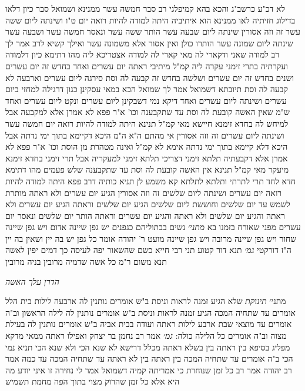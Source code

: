 \documentclass[12pt, openany]{book}
\begin{document}
{לא דכ"ע כרשב"ג והכא בהא קמיפלגי  רב סבר חמשה עשר ממנינא ושמואל סבר כיון דלאו בדילוג חזיתיה לאו ממנינא הוא 
איתיביה  היתה למודה להיות רואה יום ט"ו ושינתה ליום ששה עשר זה וזה אסורין  שינתה ליום שבעה עשר הותר ששה עשר ונאסר חמשה עשר ושבעה עשר 
שינתה ליום שמונה עשר הותרו כולן ואין אסור אלא משמונה עשר ואילך  קשיא לרב  אמר לך רב  למודה שאני 
ודקארי לה מאי קארי לה  למודה אצטריכא ליה  מהו דתימא  כיון דלמודה ועקרתיה בתרי זימני עקרה ליה קמ"ל 
מיתיבי  ראתה יום עשרים ואחד בחדש זה יום עשרים ושנים בחדש זה יום עשרים ושלשה בחדש זה קבעה לה וסת  סירגה ליום עשרים וארבעה לא קבעה לה וסת  תיובתא דשמואל 
אמר לך שמואל  הכא במאי עסקינן כגון דרגילה למחזי ביום עשרים ושינתה ליום עשרים ואחד  דיקא נמי דשבקינן ליום עשרים ונקט ליום עשרים ואחד ש"מ
שאין האשה קובעת לה וסת עד שתקבענה וכו' א"ר פפא  לא אמרן אלא למקבעה אבל למיחש לה בחדא זימנא חיישא 
מאי קמ"ל  תנינא  היתה למודה להיות רואה יום חמשה עשר ושינתה ליום עשרים זה וזה אסורין 
אי מהתם ה"א  ה"מ היכא דקיימא בתוך ימי נדתה אבל היכא דלא קיימא בתוך ימי נדתה אימא לא קמ"ל
ואינה מטהרת מן הוסת וכו' א"ר פפא  לא אמרן אלא דקבעתיה תלתא זימני דצריכי תלתא זימני למעקריה אבל תרי זימני בחדא זימנא מיעקר 
מאי קמ"ל  תנינא  אין האשה קובעת לה וסת עד שתקבענה שלש פעמים  מהו דתימא חדא לחד תרי לתרתי ותלתא לתלתא קא משמע לן 
תניא כותיה דרב פפא  היתה למודה להיות רואה יום עשרים ושינתה ליום שלשים זה וזה אסורין הגיע יום עשרים ולא ראתה מותרת לשמש עד יום שלשים וחוששת ליום שלשים 
הגיע יום שלשים וראתה הגיע יום עשרים ולא ראתה והגיע יום שלשים ולא ראתה והגיע יום עשרים וראתה הותר יום שלשים
ונאסר יום עשרים מפני שאורח בזמנו בא 
{\large\emph{מתני׳}} נשים בבתוליהם כגפנים יש גפן שיינה אדום ויש גפן שיינה שחור ויש גפן שיינה מרובה ויש גפן שיינה מועט  ר' יהודה אומר  כל גפן יש בה יין ושאין בה יין ה"ז דורקטי
{\large\emph{גמ׳}} תנא דור קטוע  תני רבי חייא  כשם שהשאור יפה לעיסה כך דמים יפין לאשה  תנא משום ר"מ  כל אשה שדמיה מרובין בניה מרובין
\par \par {\large\emph{הדרן עלך האשה}}\par \par 
מתני׳ {\large\emph{תינוקת}} שלא הגיע זמנה לראות וניסת ב"ש אומרים נותנין לה ארבעה לילות בית הלל אומרים עד שתחיה המכה
הגיע זמנה לראות וניסת ב"ש אומרים  נותנין לה לילה הראשון וב"ה אומרים עד מוצאי שבת ארבע לילות
ראתה ועודה בבית אביה ב"ש אומרים נותנין לה בעילת מצוה וב"ה אומרים כל הלילה כולה:
{\large\emph{גמ׳}} אמר רב נחמן בר יצחק ואפילו ראתה  ממאי מדקא מפליג בסיפא בין ראתה בין בשלא ראתה מכלל דרישא לא שנא הכי ולא שנא הכי 
תניא נמי הכי ב"ה אומרים  עד שתחיה המכה בין ראתה בין לא ראתה
עד שתחיה המכה עד כמה  אמר רב יהודה אמר רב  כל זמן שנוחרת  כי אמריתה קמיה דשמואל אמר לי  נחירה זו איני יודע מה היא אלא כל זמן שהרוק מצוי בתוך הפה מחמת תשמיש 
}
\end{document}
